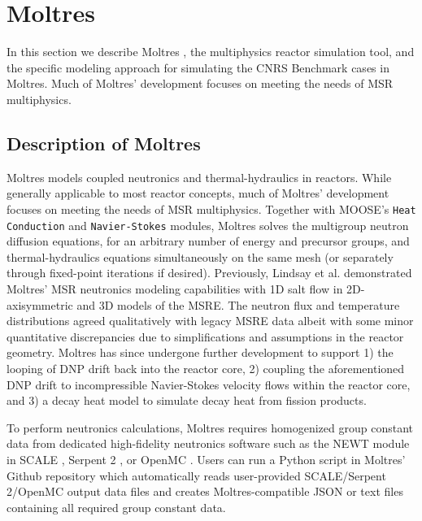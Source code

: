 \section{Moltres} \label{sec:moltres}

In this section we describe Moltres \cite{lindsay_introduction_2018}, the
multiphysics reactor simulation tool, and the specific modeling approach for
simulating the CNRS Benchmark cases in Moltres. Much of Moltres' development
focuses on meeting the needs of \gls{MSR} multiphysics.

\subsection{Description of Moltres} \label{sec:description-of-moltres}

Moltres models coupled neutronics and thermal-hydraulics in reactors. While
generally applicable to most reactor concepts, much of
Moltres' development focuses on meeting the needs of \gls{MSR} multiphysics.
Together with \gls{MOOSE}'s \cite{permann_moose_2020} \texttt{Heat}
\texttt{Conduction} and \texttt{Navier-Stokes} \cite{peterson_overview_2018}
modules, Moltres solves the multigroup neutron diffusion
equations, for an arbitrary number of energy and precursor groups, and
thermal-hydraulics equations simultaneously on the same mesh (or separately
through fixed-point iterations if desired).
Previously, Lindsay et al. \cite{lindsay_introduction_2018}
demonstrated Moltres' \gls{MSR} neutronics modeling capabilities with 1D salt
flow in 2D-axisymmetric and 3D models of the \gls{MSRE}. The neutron flux and
temperature distributions agreed qualitatively with legacy
\gls{MSRE} data albeit with some minor quantitative discrepancies due to
simplifications and assumptions in the reactor geometry. Moltres has
since undergone further development to support 1) the looping of \gls{DNP}
drift back into the reactor core, 2) coupling the aforementioned \gls{DNP}
drift to incompressible Navier-Stokes velocity flows within the reactor core,
and 3) a decay heat model to simulate decay heat from fission products.

To perform neutronics calculations, Moltres requires homogenized group constant
data from dedicated high-fidelity neutronics software such as the NEWT module
in SCALE \cite{dehart_reactor_2011}, Serpent 2 \cite{leppanen_serpent_2014}, or
OpenMC \cite{romano_openmc:_2015}. Users
can run a Python script in Moltres' Github repository which automatically reads
user-provided SCALE/Serpent 2/OpenMC output data files and creates
Moltres-compatible JSON or text files containing all required group constant
data.

